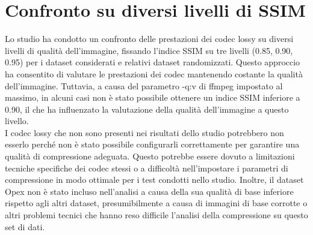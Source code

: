 \clearpage

\section{Confronto su diversi livelli di SSIM}
Lo studio ha condotto un confronto delle prestazioni dei codec lossy su diversi livelli di qualità dell'immagine, fissando l'indice SSIM su tre livelli (0.85, 0.90, 0.95) per i dataset considerati e relativi dataset randomizzati. Questo approccio ha consentito di valutare le prestazioni dei codec mantenendo costante la qualità dell'immagine. Tuttavia, a causa del parametro -q:v di ffmpeg impostato al massimo, in alcuni casi non è stato possibile ottenere un indice SSIM inferiore a 0.90, il che ha influenzato la valutazione della qualità dell'immagine a questo livello. 
\\
I codec lossy che non sono presenti nei risultati dello studio potrebbero non esserlo perché non è stato possibile configurarli correttamente per garantire una qualità di compressione adeguata. Questo potrebbe essere dovuto a limitazioni tecniche specifiche dei codec stessi o a difficoltà nell'impostare i parametri di compressione in modo ottimale per i test condotti nello studio. Inoltre, il dataset Opex non è stato incluso nell'analisi a causa della sua qualità di base inferiore rispetto agli altri dataset, presumibilmente a causa di immagini di base corrotte o altri problemi tecnici che hanno reso difficile l'analisi della compressione su questo set di dati.



